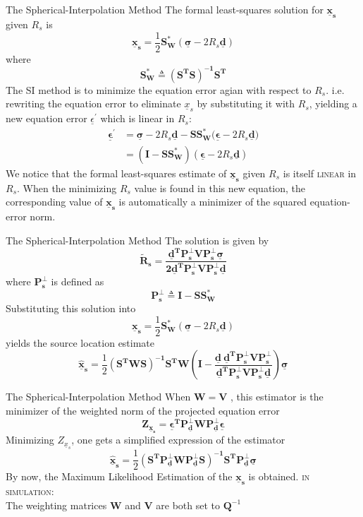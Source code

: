 \documentclass[10pt]{beamer}
\begin{document}
\begin{frame}{The Spherical-Interpolation Method}
  The formal least-squares solution for $\mathbf{\underline{x}_s}$ \alert{given} $R_s$ is
  $$ \mathbf{\underline{x}_s }= \frac{1}{2} \mathbf{S_W^*} (\boldsymbol{\underline{\sigma}} - 2R_s\mathbf{\underline{d}})$$
  where
  $$  \mathbf{S_W^* \triangleq (S^T S)^{-1}S^T} $$
  The \alert{SI} method is to minimize the equation error agian with respect to $R_s$.
  i.e. rewriting the equation error to eliminate $\underline{x}_s$ by substituting it with $R_s$, yielding a new equation error $\underline{\epsilon}^{'}$ which is linear in $R_s$:
  \begin{align*}
   \boldsymbol{\underline{\epsilon}^{'}} &= \boldsymbol{\underline{\sigma}} - 2R_s\mathbf{\underline{d} - S S^*_W (\boldsymbol{\underline{\epsilon}}} - 2R_s\mathbf{\underline{d}})\\
                            &= \mathbf{(I - S S_W^*)}(\boldsymbol{\underline{\epsilon}} - 2R_s\mathbf{\underline{d}})
  \end{align*}
  We notice that the formal least-squares estimate of  $\mathbf{\underline{x}_s}$ \alert{given} $R_s$ is itself \textsc{linear} in $R_s$. When the minimizing $R_s$ value is found
  in this new equation, the corresponding value of $\mathbf{\underline{x}_s}$ is automatically a minimizer of the squared equation-error norm.
\end{frame}
\begin{frame}{The Spherical-Interpolation Method}
  The solution is given by
  $$ \mathbf{\tilde{R}_s = \frac{\underline{d}^T P_s^{\bot}V P_s^{\bot}\boldsymbol{\underline{\sigma}}}{2\underline{d}^T P_s^{\bot} V P_s^{\bot}\underline{d}}}$$
  where $\mathbf{P_s^{\bot}}$ is defined as
  $$\mathbf{P_s^{\bot} \triangleq I - SS_W^*}$$
  Substituting this solution into
  $$  \mathbf{\underline{x}_s }= \frac{1}{2} \mathbf{S_W^*} (\boldsymbol{\underline{\sigma}} - 2R_s\mathbf{\underline{d}}) $$
  yields the source location estimate
  $$ \mathbf{\hat{\underline{x}}_s} = \frac{1}{2} \mathbf{(S^T W S)^{-1} S^T W (I - \frac{\underline{d}\ \underline{d}^T P_s^{\bot} V P_s^{\bot}} {\underline{d}^T P_s^{\bot} V P_s^{\bot} \underline{d}})} \boldsymbol{\underline{\sigma}} $$
\end{frame}
\begin{frame}{The Spherical-Interpolation Method}
  When $\mathbf{W = V}$ , this estimator is the minimizer of the weighted norm of the \alert{projected} equation error
  $$ \mathbf{Z_{\underline{x}_s} = \boldsymbol{\underline{\epsilon}}^T P_{\underline{d}}^{\bot} W P_{\underline{d}}^{\bot} \boldsymbol{\underline{\epsilon}} }$$
  Minimizing $Z_{\underline{x}_s}$, one gets a simplified expression of the estimator
  $$ \mathbf{\hat{\underline{x}}_s} = \frac{1}{2} \mathbf{(S^T  P_{\underline{d}}^{\bot} W P_{\underline{d}}^{\bot} S)^{-1} S^T P_{\underline{d}}^{\bot}} \boldsymbol{\underline{\sigma}} $$
  By now, the \alert{Maximum Likelihood Estimation} of the $\mathbf{\underline{x}_s}$ is obtained.
  \vfill
  \textsc{in simulation:\\}
  The weighting matrices $\textbf{W}$ and $\textbf{V}$ are both set to $\textbf{Q}^{-1}$
\end{frame}
\end{document}
